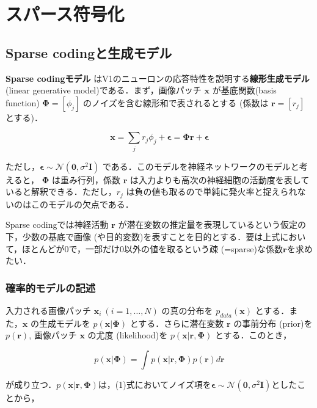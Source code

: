 \section{スパース符号化}
\subsection{Sparse codingと生成モデル}
\textbf{Sparse codingモデル} \citep{Olshausen1996-xe} \citep{Olshausen1997-qu}はV1のニューロンの応答特性を説明する\textbf{線形生成モデル} (linear generative model)である．まず，画像パッチ $\mathbf{x}$ が基底関数(basis function) $\mathbf{\Phi} = [\phi_j]$ のノイズを含む線形和で表されるとする (係数は $\mathbf{r}=[r_j]$ とする)．


\begin{equation}
\mathbf{x} = \sum_j r_j \phi_j +\boldsymbol{\epsilon}= \mathbf{\Phi} \mathbf{r}+ \boldsymbol{\epsilon}
\end{equation}


ただし，$\boldsymbol{\epsilon} \sim \mathcal{N}(\mathbf{0}, \sigma^2 \mathbf{I})$ である．このモデルを神経ネットワークのモデルと考えると， $\mathbf{\Phi}$ は重み行列，係数 $\mathbf{r}$ は入力よりも高次の神経細胞の活動度を表していると解釈できる．ただし，$r_j$ は負の値も取るので単純に発火率と捉えられないのはこのモデルの欠点である．

Sparse codingでは神経活動 $\mathbf{r}$ が潜在変数の推定量を表現しているという仮定の下，少数の基底で画像 (や目的変数)を表すことを目的とする．要は上式において，ほとんどが0で，一部だけ0以外の値を取るという疎 (=sparse)な係数$\mathbf{r}$を求めたい．
\subsubsection{確率的モデルの記述}
入力される画像パッチ $\mathbf{x}_i\ (i=1, \ldots, N)$ の真の分布を $p_{data}(\mathbf{x})$ とする．また，$\mathbf{x}$ の生成モデルを $p(\mathbf{x}|\mathbf{\Phi})$ とする．さらに潜在変数 $\mathbf{r}$ の事前分布 (prior)を $p(\mathbf{r})$, 画像パッチ $\mathbf{x}$ の尤度 (likelihood)を $p(\mathbf{x}|\mathbf{r}, \mathbf{\Phi})$ とする．このとき，


\begin{equation}
p(\mathbf{x}|\mathbf{\Phi})=\int p(\mathbf{x}|\mathbf{r}, \mathbf{\Phi})p(\mathbf{r})d\mathbf{r}
\end{equation}


が成り立つ．$p(\mathbf{x}|\mathbf{r}, \mathbf{\Phi})$は，(1)式においてノイズ項を$\boldsymbol{\epsilon} \sim\mathcal{N}(\mathbf{0}, \sigma^2 \mathbf{I})$としたことから，


